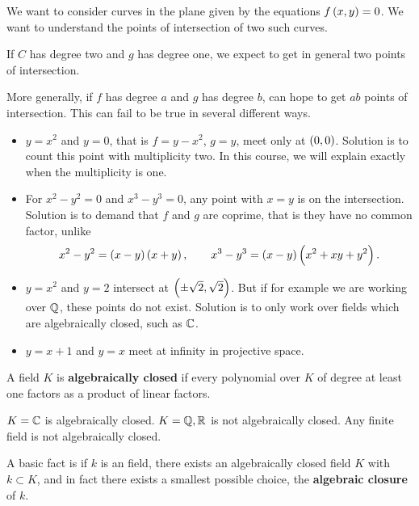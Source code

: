 We want to consider curves in the plane given by the equations $ f\br{x, y} = 0 $. We want to understand the points of intersection of two such curves.

\begin{example*}
If $ C $ has degree two and $ g $ has degree one, we expect to get in general two points of intersection.
\end{example*}

More generally, if $ f $ has degree $ a $ and $ g $ has degree $ b $, can hope to get $ ab $ points of intersection. This can fail to be true in several different ways.
\begin{itemize}
\item $ y = x^2 $ and $ y = 0 $, that is $ f = y - x^2 $, $ g = y $, meet only at $ \br{0, 0} $. Solution is to count this point with multiplicity two. In this course, we will explain exactly when the multiplicity is one.
\item For $ x^2 - y^2 = 0 $ and $ x^3 - y^3 = 0 $, any point with $ x = y $ is on the intersection. Solution is to demand that $ f $ and $ g $ are coprime, that is they have no common factor, unlike
$$ x^2 - y^2 = \br{x - y}\br{x + y}, \qquad x^3 - y^3 = \br{x - y}\br{x^2 + xy + y^2}. $$
\item $ y = x^2 $ and $ y = 2 $ intersect at $ \br{\pm \sqrt{2}, \sqrt{2}} $. But if for example we are working over $ \mathbb{Q} $, these points do not exist. Solution is to only work over fields which are algebraically closed, such as $ \mathbb{C} $.
\item $ y = x + 1 $ and $ y = x $ meet at infinity in projective space.
\end{itemize}

\begin{definition}
A field $ K $ is \textbf{algebraically closed} if every polynomial over $ K $ of degree at least one factors as a product of linear factors.
\end{definition}

\begin{example*}
$ K = \mathbb{C} $ is algebraically closed. $ K = \mathbb{Q}, \mathbb{R} $ is not algebraically closed. Any finite field is not algebraically closed.
\end{example*}

A basic fact is if $ k $ is an field, there exists an algebraically closed field $ K $ with $ k \subset K $, and in fact there exists a smallest possible choice, the \textbf{algebraic closure} of $ k $.


